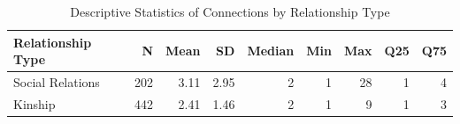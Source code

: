 \begin{table}

\caption{\label{tab:tbl_connection_stats}Descriptive Statistics of Connections by Relationship Type}
\centering
\begin{tabular}[t]{lrrrrrrrr}
\toprule
Relationship Type & N & Mean & SD & Median & Min & Max & Q25 & Q75\\
\midrule
Social Relations & 202 & 3.11 & 2.95 & 2 & 1 & 28 & 1 & 4\\
Kinship & 442 & 2.41 & 1.46 & 2 & 1 & 9 & 1 & 3\\
\bottomrule
\end{tabular}
\end{table}
